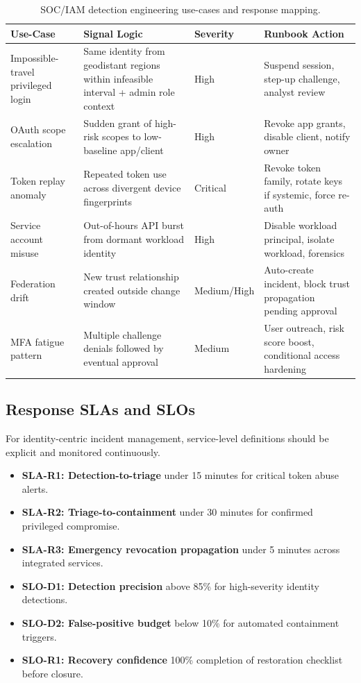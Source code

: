 \documentclass[11pt]{article}
\begin{document}
\begin{table}[H]
\centering
\small
\begin{tabular}{p{} p{} p{} p{}}
\toprule
\textbf{Use-Case} & \textbf{Signal Logic} & \textbf{Severity} & \textbf{Runbook Action} \\
\midrule
Impossible-travel privileged login & Same identity from geodistant regions within infeasible interval + admin role context & High & Suspend session, step-up challenge, analyst review \\
OAuth scope escalation & Sudden grant of high-risk scopes to low-baseline app/client & High & Revoke app grants, disable client, notify owner \\
Token replay anomaly & Repeated token use across divergent device fingerprints & Critical & Revoke token family, rotate keys if systemic, force re-auth \\
Service account misuse & Out-of-hours API burst from dormant workload identity & High & Disable workload principal, isolate workload, forensics \\
Federation drift & New trust relationship created outside change window & Medium/High & Auto-create incident, block trust propagation pending approval \\
MFA fatigue pattern & Multiple challenge denials followed by eventual approval & Medium & User outreach, risk score boost, conditional access hardening \\
\bottomrule
\end{tabular}
\caption{SOC/IAM detection engineering use-cases and response mapping.}
\label{tab:detections}
\end{table}

\subsection{Response SLAs and SLOs}
For identity-centric incident management, service-level definitions should be explicit and monitored continuously.
\begin{itemize}[leftmargin=1.5em]
    \item \textbf{SLA-R1: Detection-to-triage} under 15 minutes for critical token abuse alerts.
    \item \textbf{SLA-R2: Triage-to-containment} under 30 minutes for confirmed privileged compromise.
    \item \textbf{SLA-R3: Emergency revocation propagation} under 5 minutes across integrated services.
    \item \textbf{SLO-D1: Detection precision} above 85\% for high-severity identity detections.
    \item \textbf{SLO-D2: False-positive budget} below 10\% for automated containment triggers.
    \item \textbf{SLO-R1: Recovery confidence} 100\% completion of restoration checklist before closure.
\end{itemize}
\end{document}
